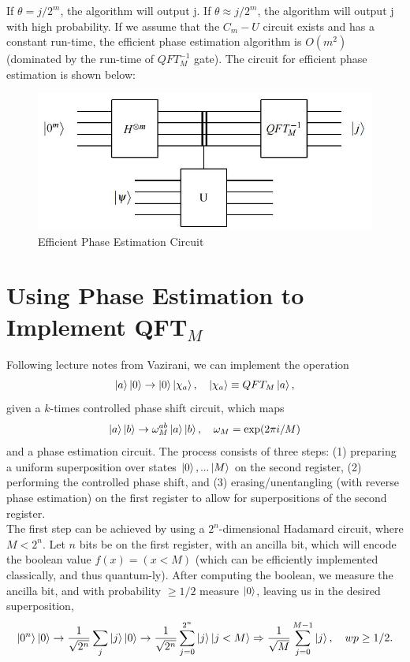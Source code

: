 \documentclass[11pt]{journal}
\begin{document}
If $\theta=j/2^m$, the algorithm will output j. If $\theta \approx j/2^m$, the algorithm will output j with high probability. If we assume that the $C_m-U$ circuit exists and has a constant run-time, the efficient phase estimation algorithm is $O(m^2)$ (dominated by the run-time of $QFT_M^{-1}$ gate). The circuit for efficient phase estimation is shown below\cite{vaz}:

\begin{figure}[H]
    \centering
    \includegraphics[scale = 0.5]{4.JPG}
    \caption{Efficient Phase Estimation Circuit}
    \label{fig:my_label}
\end{figure}

\section{Using Phase Estimation to Implement QFT$_M$}
Following lecture notes from Vazirani\cite{vaz}, we can implement the operation
\[\ket{a} \ket{0} \rightarrow \ket{0} \ket{\chi_a}, \quad \ket{\chi_a} \equiv QFT_M \ket{a},\]
given a $k$-times controlled phase shift circuit, which maps 
\[\ket{a} \ket{b} \rightarrow \omega_M^{ab} \ket{a} \ket{b}, \quad \omega_M = \exp(2 \pi i/M)\]
and a phase estimation circuit. The process consists of three steps: (1) preparing a uniform superposition over states $\ket{0}, ... \ket{M}$ on the second register, (2) performing the controlled phase shift, and (3) erasing/unentangling (with reverse phase estimation) on the first register to allow for superpositions of the second register.\\

The first step can be achieved by using a $2^n$-dimensional Hadamard circuit, where $M < 2^n$. Let $n$ bits be on the first register, with an ancilla bit, which will encode the boolean value $f(x) = (x < M)$ (which can be efficiently implemented classically, and thus quantum-ly). After computing the boolean, we measure the ancilla bit, and with probability $\geq 1/2$ measure $\ket{0}$, leaving us in the desired superposition,
\[\ket{0^n} \ket{0} \rightarrow {1\over \sqrt{2^n}} \sum_j \ket{j} \ket{0} \rightarrow {1\over \sqrt{2^n}} \sum_{j = 0}^{2^n} \ket{j} \ket{j < M}\Rightarrow {1 \over \sqrt{M}} \sum_{j = 0}^{M - 1} \ket{j}, \quad wp \geq 1/2.\]
\end{document}
